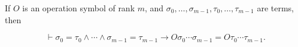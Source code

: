 If $O$ is an operation symbol of rank $m$, and $\sigma_0, \ldots, \sigma_{m-1}, \tau_0, \ldots, \tau_{m-1}$ are terms, then

$$\vdash \sigma_0 = \tau_0 \wedge \cdots \wedge \sigma_{m-1} = \tau_{m-1} \rightarrow O \sigma_0 \cdots \sigma_{m-1} = O \tau_0 \cdots \tau_{m-1}.$$
